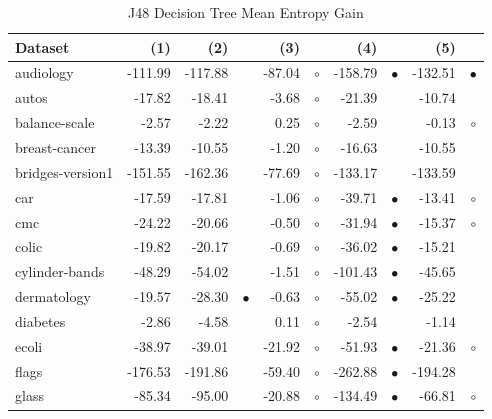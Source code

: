 \newpage
{\centering \footnotesize \begin{longtable}{lrr@{\hspace{0.1cm}}cr@{\hspace{0.1cm}}cr@{\hspace{0.1cm}}cr@{\hspace{0.1cm}}c}
\caption{\label{j48meg}J48 Decision Tree Mean Entropy Gain}
\\
\hline
Dataset & (1)& (2) & & (3) & & (4) & & (5) & \\
\hline
audiology & -111.99 & -117.88 &           &  -87.04 &  $\circ$ & -158.79 & $\bullet$ & -132.51 & $\bullet$\\
autos &  -17.82 &  -18.41 &           &   -3.68 &  $\circ$ &  -21.39 &           &  -10.74 &          \\
balance-scale &   -2.57 &   -2.22 &           &    0.25 &  $\circ$ &   -2.59 &           &   -0.13 &   $\circ$\\
breast-cancer &  -13.39 &  -10.55 &           &   -1.20 &  $\circ$ &  -16.63 &           &  -10.55 &          \\
bridges-version1 & -151.55 & -162.36 &           &  -77.69 &  $\circ$ & -133.17 &           & -133.59 &          \\
car &  -17.59 &  -17.81 &           &   -1.06 &  $\circ$ &  -39.71 & $\bullet$ &  -13.41 &   $\circ$\\
cmc &  -24.22 &  -20.66 &           &   -0.50 &  $\circ$ &  -31.94 & $\bullet$ &  -15.37 &   $\circ$\\
colic &  -19.82 &  -20.17 &           &   -0.69 &  $\circ$ &  -36.02 & $\bullet$ &  -15.21 &          \\
cylinder-bands &  -48.29 &  -54.02 &           &   -1.51 &  $\circ$ & -101.43 & $\bullet$ &  -45.65 &          \\
dermatology &  -19.57 &  -28.30 & $\bullet$ &   -0.63 &  $\circ$ &  -55.02 & $\bullet$ &  -25.22 &          \\
diabetes &   -2.86 &   -4.58 &           &    0.11 &  $\circ$ &   -2.54 &           &   -1.14 &          \\
ecoli &  -38.97 &  -39.01 &           &  -21.92 &  $\circ$ &  -51.93 & $\bullet$ &  -21.36 &   $\circ$\\
flags & -176.53 & -191.86 &           &  -59.40 &  $\circ$ & -262.88 & $\bullet$ & -194.28 &          \\
glass &  -85.34 &  -95.00 &           &  -20.88 &  $\circ$ & -134.49 & $\bullet$ &  -66.81 &   $\circ$\\

\end{longtable}}
